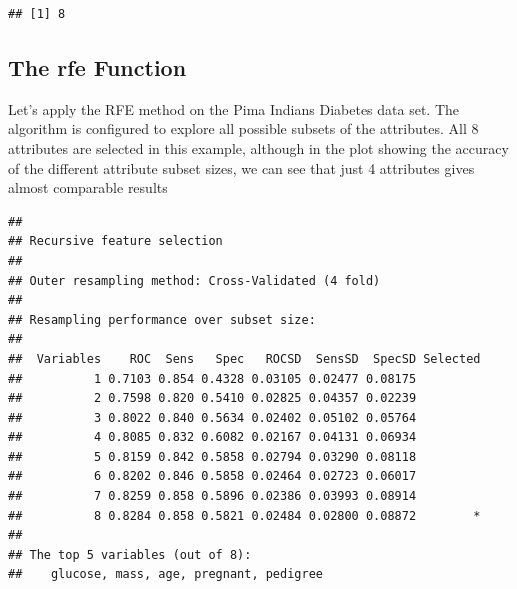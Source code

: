 \documentclass[]{book}
\newenvironment{Shaded}{\begin{snugshade}}{\end{snugshade}}
\newcommand{\KeywordTok}[1]{\textcolor[rgb]{0.13,0.29,0.53}{\textbf{#1}}}
\newcommand{\DataTypeTok}[1]{\textcolor[rgb]{0.13,0.29,0.53}{#1}}
\newcommand{\DecValTok}[1]{\textcolor[rgb]{0.00,0.00,0.81}{#1}}
\newcommand{\StringTok}[1]{\textcolor[rgb]{0.31,0.60,0.02}{#1}}
\newcommand{\CommentTok}[1]{\textcolor[rgb]{0.56,0.35,0.01}{\textit{#1}}}
\newcommand{\OperatorTok}[1]{\textcolor[rgb]{0.81,0.36,0.00}{\textbf{#1}}}
\newcommand{\NormalTok}[1]{#1}
\begin{document}
\begin{verbatim}
## [1] 8
\end{verbatim}

\subsection{The rfe Function}\label{the-rfe-function}

Let's apply the RFE method on the Pima Indians Diabetes data set. The
algorithm is configured to explore all possible subsets of the
attributes. All 8 attributes are selected in this example, although in
the plot showing the accuracy of the different attribute subset sizes,
we can see that just 4 attributes gives almost comparable results

\begin{Shaded}
\end{Shaded}

\begin{verbatim}
## 
## Recursive feature selection
## 
## Outer resampling method: Cross-Validated (4 fold) 
## 
## Resampling performance over subset size:
## 
##  Variables    ROC  Sens   Spec   ROCSD  SensSD  SpecSD Selected
##          1 0.7103 0.854 0.4328 0.03105 0.02477 0.08175         
##          2 0.7598 0.820 0.5410 0.02825 0.04357 0.02239         
##          3 0.8022 0.840 0.5634 0.02402 0.05102 0.05764         
##          4 0.8085 0.832 0.6082 0.02167 0.04131 0.06934         
##          5 0.8159 0.842 0.5858 0.02794 0.03290 0.08118         
##          6 0.8202 0.846 0.5858 0.02464 0.02723 0.06017         
##          7 0.8259 0.858 0.5896 0.02386 0.03993 0.08914         
##          8 0.8284 0.858 0.5821 0.02484 0.02800 0.08872        *
## 
## The top 5 variables (out of 8):
##    glucose, mass, age, pregnant, pedigree
\end{verbatim}
\end{document}
